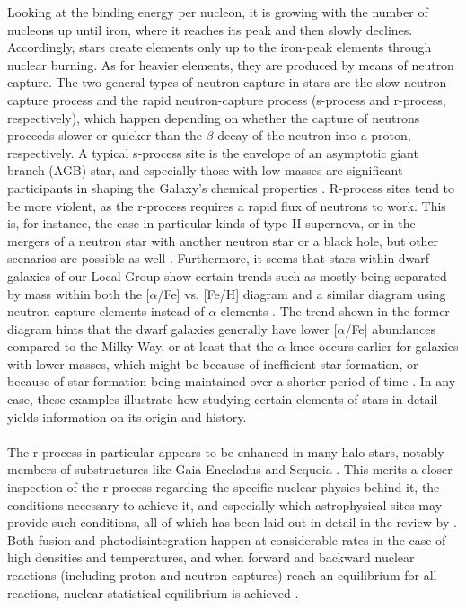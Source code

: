 \documentclass[a4paper,11pt]{article}
\begin{document}
Looking at the binding energy per nucleon, it is growing with the number of nucleons up until iron, where it reaches its peak and then slowly declines. Accordingly, stars create elements only up to the iron-peak elements through nuclear burning. As for heavier elements, they are produced by means of neutron capture. The two general types of neutron capture in stars are the slow neutron-capture process and the rapid neutron-capture process (s-process and r-process, respectively), which happen depending on whether the capture of neutrons proceeds slower or quicker than the $\beta$-decay of the neutron into a proton, respectively. A typical s-process site is the envelope of an asymptotic giant branch (AGB) star, and especially those with low masses are significant participants in shaping the Galaxy's chemical properties \citep{kappeler11}. R-process sites tend to be more violent, as the r-process requires a rapid flux of neutrons to work. This is, for instance, the case in particular kinds of type II supernova, or in the mergers of a neutron star with another neutron star or a black hole, but other scenarios are possible as well \citep{cowan21}. Furthermore, it seems that stars within dwarf galaxies of our Local Group show certain trends such as mostly being separated by mass within both the [$\alpha$/Fe] vs. [Fe/H] diagram and a similar diagram using neutron-capture elements instead of $\alpha$-elements \citep{tolstoy09}. The trend shown in the former diagram hints that the dwarf galaxies generally have lower [$\alpha$/Fe] abundances compared to the Milky Way, or at least that the $\alpha$ knee occurs earlier for galaxies with lower masses, which might be because of inefficient star formation, or because of star formation being maintained over a shorter period of time \citep{helmi18}. In any case, these examples illustrate how studying certain elements of stars in detail yields information on its origin and history.\\ \\
%
The r-process in particular appears to be enhanced in many halo stars, notably members of substructures like Gaia-Enceladus and Sequoia \citep{matsuno21,aguado21,roederer18}. This merits a closer inspection of the r-process regarding the specific nuclear physics behind it, the conditions necessary to achieve it, and especially which astrophysical sites may provide such conditions, all of which has been laid out in detail in the review by \citet{cowan21}. Both fusion and photodisintegration happen at considerable rates in the case of high densities and temperatures, and when forward and backward nuclear reactions (including proton and neutron-captures) reach an equilibrium for all reactions, nuclear statistical equilibrium is achieved \citep{hix99}.\\ \\
\end{document}
